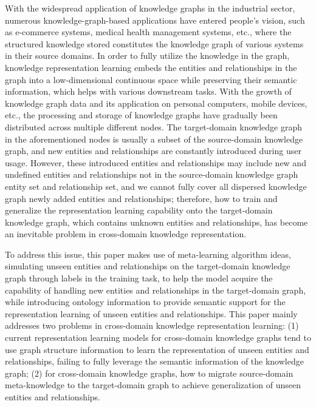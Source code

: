 With the widespread application of knowledge graphs in the industrial sector, numerous knowledge-graph-based applications have entered people's vision, such as e-commerce systems, medical health management systems, etc., where the structured knowledge stored constitutes the knowledge graph of various systems in their source domains. In order to fully utilize the knowledge in the graph, knowledge representation learning embeds the entities and relationships in the graph into a low-dimensional continuous space while preserving their semantic information, which helps with various downstream tasks. With the growth of knowledge graph data and its application on personal computers, mobile devices, etc., the processing and storage of knowledge graphs have gradually been distributed across multiple different nodes. The target-domain knowledge graph in the aforementioned nodes is usually a subset of the source-domain knowledge graph, and new entities and relationships are constantly introduced during user usage. However, these introduced entities and relationships may include new and undefined entities and relationships not in the source-domain knowledge graph entity set and relationship set, and we cannot fully cover all dispersed knowledge graph newly added entities and relationships; therefore, how to train and generalize the representation learning capability onto the target-domain knowledge graph, which contains unknown entities and relationships, has become an inevitable problem in cross-domain knowledge representation.

To address this issue, this paper makes use of meta-learning algorithm ideas, simulating unseen entities and relationships on the target-domain knowledge graph through labels in the training task, to help the model acquire the capability of handling new entities and relationships in the target-domain graph, while introducing ontology information to provide semantic support for the representation learning of unseen entities and relationships. This paper mainly addresses two problems in cross-domain knowledge representation learning: (1) current representation learning models for cross-domain knowledge graphs tend to use graph structure information to learn the representation of unseen entities and relationships, failing to fully leverage the semantic information of the knowledge graph; (2) for cross-domain knowledge graphs, how to migrate source-domain meta-knowledge to the target-domain graph to achieve generalization of unseen entities and relationships.

